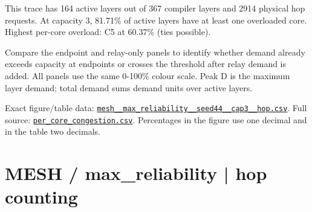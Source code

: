 \documentclass[10pt,a4paper]{article}
\begin{document}
This trace has 164 active layers out of 367 compiler layers and 2914 physical hop requests. At capacity 3, 81.71\% of active layers have at least one overloaded core. Highest per-core overload: C5 at 60.37\% (ties possible).\par
Compare the endpoint and relay-only panels to identify whether demand already exceeds capacity at endpoints or crosses the threshold after relay demand is added. All panels use the same 0-100\% colour scale. Peak D is the maximum layer demand; total demand sums demand units over active layers.\par
Exact figure/table data: \href{\detokenize{file:///home/dhruv-pansuriya/Documents/BTP/Compiler-Driven-ACE/output/pdf/qaoa_methods_congestion/tables/mesh__max_reliability__seed44__cap3__hop.csv}}{\nolinkurl{mesh__max_reliability__seed44__cap3__hop.csv}}. Full source: \href{\detokenize{file:///home/dhruv-pansuriya/Documents/BTP/Compiler-Driven-ACE/results/qaoa_2seed_2026-10-26/congestion/per_core_congestion.csv}}{\nolinkurl{per_core_congestion.csv}}. Percentages in the figure use one decimal and in the table two decimals.\par
\clearpage
\section*{MESH / max\_reliability | hop counting}
\end{document}
